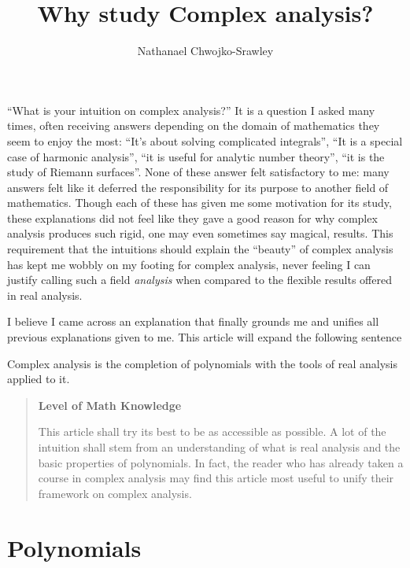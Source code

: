\documentclass[oneside]{article}
\title{Why study Complex analysis?}
\author{Nathanael Chwojko-Srawley}
\newenvironment{titledBox}[1]
 {\begin{tcolorbox}[enhanced, sharp corners, colback=white , borderline={0.2pt}{0pt}{black}]
   \begin{quote}\textbf{#1}
   }{
   \end{quote}\end{tcolorbox}}
\begin{document}
``What is your intuition on complex analysis?'' It is a question I asked many times, often receiving answers
depending on the domain of mathematics they seem to enjoy the most: ``It's about solving complicated
integrals'', ``It is a special case of harmonic analysis'', ``it is useful for analytic number theory'', ``it
is the study of Riemann surfaces''. None of these answer felt satisfactory to me: many answers felt like it
deferred the responsibility for its purpose to another field of mathematics. Though each of these has given me
some motivation for its study, these explanations did not feel like they gave a good reason for why complex
analysis produces such rigid, one may even sometimes say magical, results. This requirement that the
intuitions should explain the ``beauty'' of complex analysis has kept me wobbly on my footing for complex
analysis, never feeling I can justify calling such a field \emph{analysis} when compared to the flexible
results offered in real analysis.

I believe I came across an explanation that finally grounds me and unifies all previous explanations given to
me. This article will expand the following sentence
\begin{center}
  \addtolength{\leftskip}{2cm}  %
\addtolength{\rightskip}{2cm} %
  Complex analysis is the completion of polynomials with the tools of real analysis applied to it.
\end{center}

\begin{titledBox}{Level of Math Knowledge}
  This article shall try its best to be as accessible as possible. A lot of the intuition shall stem
  from an understanding of what is real analysis and the basic properties of polynomials. In fact, the reader
  who has already taken a course in complex analysis may find this article most useful to unify their
  framework on complex analysis.
\end{titledBox}

\section{Polynomials}
\end{document}
